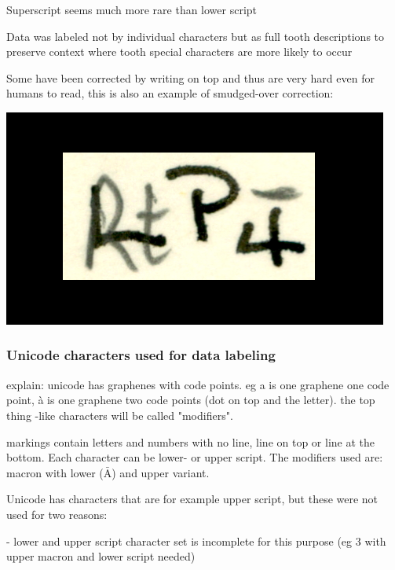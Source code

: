 \documentclass{article}
\begin{document}
Superscript seems much more rare than lower script

Data was labeled not by individual characters but as full tooth descriptions
to preserve context where tooth special characters are more likely to occur

Some have been corrected by writing on top and thus are very hard 
even for humans to read, this is also an example of smudged-over correction: 

\includegraphics*[scale=0.2]{../images/superambiguous_data_sample.png}

\subsubsection{Unicode characters used for data labeling}

explain: unicode has graphenes with code points. eg a is one graphene one code point,
à is one graphene two code points (dot on top and the letter). the top thing -like characters will be called 
"modifiers".

markings contain letters and numbers with no line, line on top or line at the bottom.
Each character can be lower- or upper script. The modifiers used are: 
macron with lower ($\bar{\mathrm{A}}$) and upper variant.

Unicode \cite{unicode_homepage} has characters that are for example upper script, but 
these were not used for two reasons:

- lower and upper script character set is incomplete for this purpose (eg 3 with upper macron and lower script needed)
\end{document}
